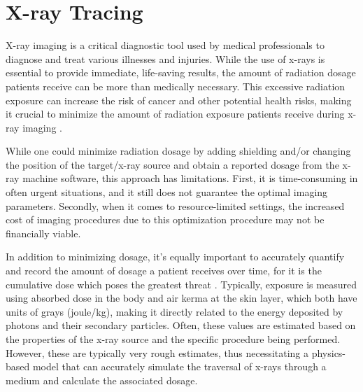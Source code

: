 
%

\chapter{X-ray Tracing}
\label{cha:xray_tracing}

\par X-ray imaging is a critical diagnostic tool used by medical professionals to diagnose and treat various illnesses and injuries. While the use of x-rays is essential to provide immediate, life-saving results, the amount of radiation dosage patients receive can be more than medically necessary. This excessive radiation exposure can increase the risk of cancer and other potential health risks, making it crucial to minimize the amount of radiation exposure patients receive during x-ray imaging \cite{RadiationEffects}.

\par While one could minimize radiation dosage by adding shielding and/or changing the position of the target/x-ray source and obtain a reported dosage from the x-ray machine software, this approach has limitations. First, it is time-consuming in often urgent situations, and it still does not guarantee the optimal imaging parameters. Secondly, when it comes to resource-limited settings, the increased cost of imaging procedures due to this optimization procedure may not be financially viable.

\par In addition to minimizing dosage, it's equally important to accurately quantify and record the amount of dosage a patient receives over time, for it is the cumulative dose which poses the greatest threat \cite{lauer2009elements}. Typically, exposure is measured using absorbed dose in the body and air kerma at the skin layer, which both have units of grays (joule/kg), making it directly related to the energy deposited by photons and their secondary particles. Often, these values are estimated based on the properties of the x-ray source and the specific procedure being performed. However, these are typically very rough estimates, thus necessitating a physics-based model that can accurately simulate the traversal of x-rays through a medium and calculate the associated dosage.

